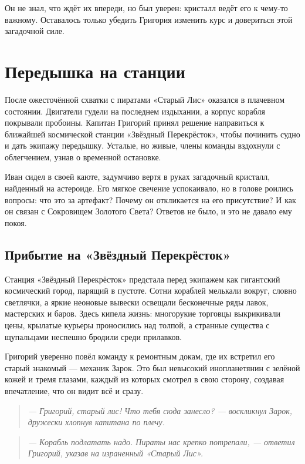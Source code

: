 \documentclass[12pt,a4paper]{book}
\newenvironment{dialogue}{\begin{quote}\itshape}{\end{quote}}
\begin{document}
Он не знал, что ждёт их впереди, но был уверен: кристалл ведёт его к чему-то важному. Оставалось только убедить Григория изменить курс и довериться этой загадочной силе.

\chapter{Передышка на станции}

После ожесточённой схватки с пиратами «Старый Лис» оказался в плачевном состоянии. Двигатели гудели на последнем издыхании, а корпус корабля покрывали пробоины. Капитан Григорий принял решение направиться к ближайшей космической станции «Звёздный Перекрёсток», чтобы починить судно и дать экипажу передышку. Усталые, но живые, члены команды вздохнули с облегчением, узнав о временной остановке.

Иван сидел в своей каюте, задумчиво вертя в руках загадочный кристалл, найденный на астероиде. Его мягкое свечение успокаивало, но в голове роились вопросы: что это за артефакт? Почему он откликается на его присутствие? И как он связан с Сокровищем Золотого Света? Ответов не было, и это не давало ему покоя.

\section*{Прибытие на «Звёздный Перекрёсток»}

Станция «Звёздный Перекрёсток» предстала перед экипажем как гигантский космический город, парящий в пустоте. Сотни кораблей мелькали вокруг, словно светлячки, а яркие неоновые вывески освещали бесконечные ряды лавок, мастерских и баров. Здесь кипела жизнь: многорукие торговцы выкрикивали цены, крылатые курьеры проносились над толпой, а странные существа с щупальцами неспешно бродили среди прилавков.

Григорий уверенно повёл команду к ремонтным докам, где их встретил его старый знакомый --- механик Зарок. Это был невысокий инопланетянин с зелёной кожей и тремя глазами, каждый из которых смотрел в свою сторону, создавая впечатление, что он видит всё и сразу.

\begin{dialogue}
--- Григорий, старый лис! Что тебя сюда занесло? --- воскликнул Зарок, дружески хлопнув капитана по плечу.
\end{dialogue}

\begin{dialogue}
--- Корабль подлатать надо. Пираты нас крепко потрепали, --- ответил Григорий, указав на израненный «Старый Лис».
\end{dialogue}
\end{document}
